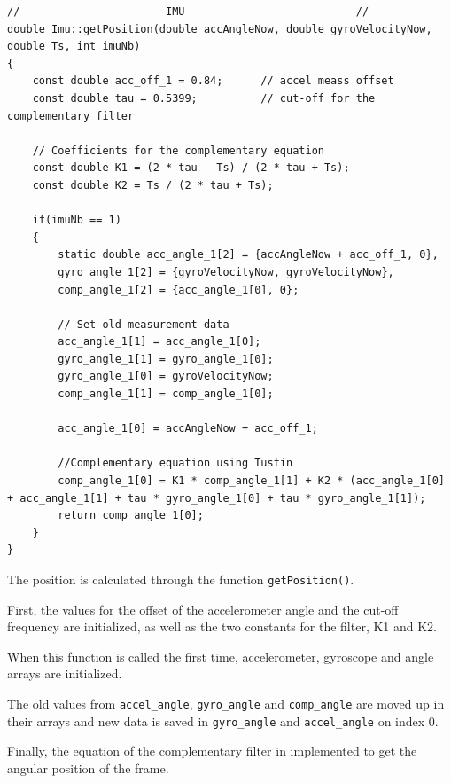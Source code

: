 \begin{lstlisting}[style = customcpp,
				caption  = {Code for the implementation of the complementary filter in C\texttt{++}.},
				label    = codeCompFilter ]
//---------------------- IMU --------------------------//
double Imu::getPosition(double accAngleNow, double gyroVelocityNow, double Ts, int imuNb)
{
	const double acc_off_1 = 0.84;  	// accel meass offset
	const double tau = 0.5399;			// cut-off for the complementary filter

	// Coefficients for the complementary equation
	const double K1 = (2 * tau - Ts) / (2 * tau + Ts);
	const double K2 = Ts / (2 * tau + Ts);

	if(imuNb == 1) 
	{
		static double acc_angle_1[2] = {accAngleNow + acc_off_1, 0},
		gyro_angle_1[2] = {gyroVelocityNow, gyroVelocityNow},
		comp_angle_1[2] = {acc_angle_1[0], 0};

		// Set old measurement data
		acc_angle_1[1] = acc_angle_1[0];
		gyro_angle_1[1] = gyro_angle_1[0];
		gyro_angle_1[0] = gyroVelocityNow;
		comp_angle_1[1] = comp_angle_1[0];

		acc_angle_1[0] = accAngleNow + acc_off_1;

		//Complementary equation using Tustin
		comp_angle_1[0] = K1 * comp_angle_1[1] + K2 * (acc_angle_1[0] + acc_angle_1[1] + tau * gyro_angle_1[0] + tau * gyro_angle_1[1]);
		return comp_angle_1[0];
	}
}

\end{lstlisting}

The position is calculated through the function \lstinline[style=customcppinline]{getPosition()}.

First, the values for the offset of the accelerometer angle and the cut-off frequency are initialized, as well as the two constants for the filter, K1 and K2.

When this function is called the first time, accelerometer, gyroscope and angle arrays are initialized.

The old values from \lstinline[style=customcppinline]{accel_angle}, \lstinline[style=customcppinline]{gyro_angle} and \lstinline[style=customcppinline]{comp_angle} are moved up in their arrays and new data is saved in \lstinline[style=customcppinline]{gyro_angle} and \lstinline[style=customcppinline]{accel_angle} on index 0. 

Finally, the equation of the complementary filter in implemented to get the angular position of the frame.
